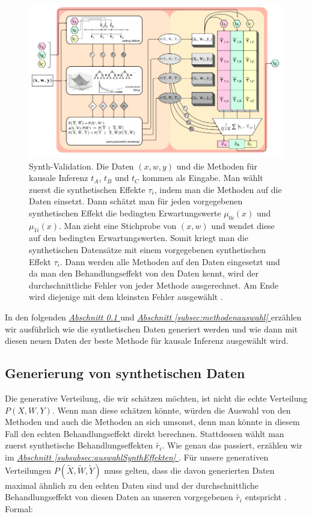 \documentclass[12pt,a4paper,twoside]{scrartcl}
\numberwithin{equation}{section}
\newcommand{\refsec}[1]{\emph{\hyperref[#1]{Abschnitt \ref*{#1} }}}
\begin{document}
\begin{center}
  \vspace{6mm}
  \begin{figure}[h]
    \centering
    \includegraphics[height=0.5\textwidth, width=1\textwidth]{figures/synth-validation.png}
    \caption[Synth-Validation] {Synth-Validation. Die Daten $(x,w,y)$ und die Methoden für kausale Inferenz $t_A$, $t_B$ und $t_C$ kommen als Eingabe. Man wählt zuerst die synthetischen Effekte $\tau_i$, indem man die Methoden auf die Daten einsetzt. Dann schätzt man für jeden vorgegebenen synthetischen Effekt die bedingten Erwartungswerte $\mu_{0i}(x)$ und $\mu_{1i}(x)$. Man zieht eine Stichprobe von $(x,w)$ und wendet diese auf den bedingten Erwartungswerten. Somit kriegt man die synthetischen Datensätze mit einem vorgegebenen synthetischen Effekt $\tau_i$. Dann werden alle Methoden auf den Daten eingesetzt und da man den Behandlungseffekt von den Daten kennt, wird der durchschnittliche Fehler von jeder Methode ausgerechnet. Am Ende wird diejenige mit dem kleinsten Fehler ausgewählt \cite{schuler2017synth}.}\label{fig:synthValidation}
  \end{figure}
\end{center}

\noindent
In den folgenden \refsec{subsec:generierungSynthDaten} und \refsec{subsec:methodenauswahl} erzählen wir ausführlich wie die synthetischen Daten generiert werden und wie dann mit diesen neuen Daten der beste Methode für kausale Inferenz ausgewählt wird.\par

  	\subsection{Generierung von synthetischen Daten}\label{subsec:generierungSynthDaten}
  	Die generative Verteilung, die wir schätzen möchten, ist nicht die echte Verteilung $P(X,W,Y)$. Wenn man diese schätzen könnte, würden die Auswahl von den Methoden und auch die Methoden an sich umsonst, denn man könnte in diesem Fall den echten Behandlungseffekt direkt berechnen. Stattdessen wählt man zuerst synthetische Behandlungseffekten $\tilde{r_i}$. Wie genau das passiert, erzählen wir im \refsec{subsubsec:auswahlSynthEffekten}. Für unsere generativen Verteilungen  $P(\widetilde{X},\widetilde{W},\widetilde{Y})$ muss gelten, dass die davon generierten Daten maximal ähnlich zu den echten Daten sind und der durchschnittliche Behandlungseffekt von diesen Daten an unseren vorgegebenen $\tilde{r_i}$  entspricht \cite{schuler2017synth}. Formal:\par
  	
\end{document}
